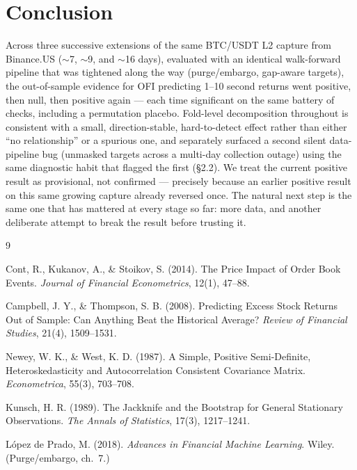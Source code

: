 \documentclass[11pt]{article}
\begin{document}
\section{Conclusion}

Across three successive extensions of the same BTC/USDT L2 capture from Binance.US ($\sim$7, $\sim$9, and $\sim$16 days), evaluated with an identical walk-forward pipeline that was tightened along the way (purge/embargo, gap-aware targets), the out-of-sample evidence for OFI predicting 1--10 second returns went positive, then null, then positive again --- each time significant on the same battery of checks, including a permutation placebo. Fold-level decomposition throughout is consistent with a small, direction-stable, hard-to-detect effect rather than either ``no relationship'' or a spurious one, and separately surfaced a second silent data-pipeline bug (unmasked targets across a multi-day collection outage) using the same diagnostic habit that flagged the first (\S2.2). We treat the current positive result as provisional, not confirmed --- precisely because an earlier positive result on this same growing capture already reversed once. The natural next step is the same one that has mattered at every stage so far: more data, and another deliberate attempt to break the result before trusting it.

\begin{thebibliography}{9}

Cont, R., Kukanov, A., \& Stoikov, S. (2014). The Price Impact of Order Book Events. \emph{Journal of Financial Econometrics}, 12(1), 47--88.

Campbell, J. Y., \& Thompson, S. B. (2008). Predicting Excess Stock Returns Out of Sample: Can Anything Beat the Historical Average? \emph{Review of Financial Studies}, 21(4), 1509--1531.

Newey, W. K., \& West, K. D. (1987). A Simple, Positive Semi-Definite, Heteroskedasticity and Autocorrelation Consistent Covariance Matrix. \emph{Econometrica}, 55(3), 703--708.

Kunsch, H. R. (1989). The Jackknife and the Bootstrap for General Stationary Observations. \emph{The Annals of Statistics}, 17(3), 1217--1241.

L\'opez de Prado, M. (2018). \emph{Advances in Financial Machine Learning}. Wiley. (Purge/embargo, ch.\ 7.)

\end{thebibliography}
\end{document}
